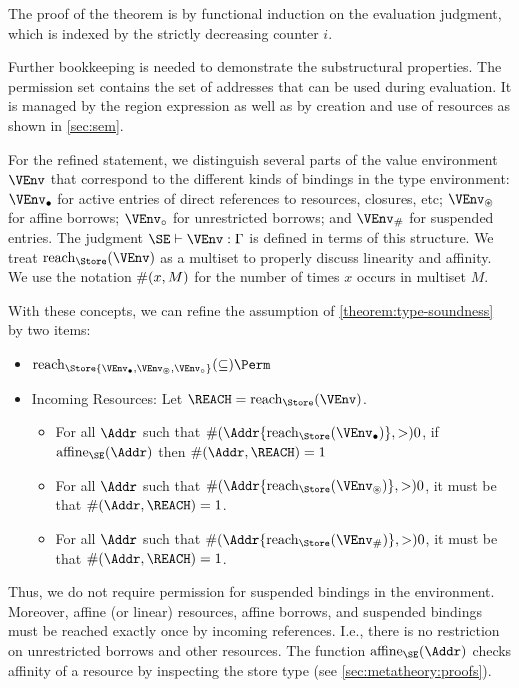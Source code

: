 The proof of the
theorem is by functional induction on the evaluation judgment, which
is indexed by the strictly decreasing counter $i$.

Further bookkeeping is needed to demonstrate the substructural
properties. The permission set contains the set
of addresses that can be used during evaluation. It is managed by the
region expression as well as by creation and use of resources as
shown in \cref{sec:sem}.

For the refined statement, we distinguish several parts of the value
environment $\VEnv$ that correspond to the different kinds of bindings in the
type environment: $\Active\VEnv$ for active entries of direct
references to resources, closures, etc; $\MutableBorrows\VEnv$ for 
affine borrows; $\ImmutableBorrows\VEnv$ for unrestricted borrows;
and $\Suspended\VEnv$ for suspended entries. The judgment
$\SE \vdash \VEnv:\E$ is defined in terms of this structure.
We treat
$\Reach\Store\VEnv$ as a multiset to properly discuss linearity and
affinity. We use the notation $\#(x,M)$ for the number of
times $x$ occurs in multiset $M$.


With these concepts, we can refine the assumption of
\cref{theorem:type-soundness} by two items:
\begin{itemize}
\item $\Reach\Store{\Active\VEnv, \MutableBorrows\VEnv, \ImmutableBorrows\VEnv} \subseteq \Perm$
\item Incoming Resources: Let $\REACH = \Reach\Store\VEnv$.
  \begin{itemize}
  \item 
    For all $\Addr$ such that $\MultiNumber\Addr{\Reach{\Store}{\Active\VEnv}} >0$,
    if $\Affine{\SE}\Addr$ then $\MultiNumber\Addr\REACH= 1$
  \item For all $\Addr$ such that $
    \MultiNumber\Addr{\Reach{\Store}{\MutableBorrows\VEnv}} >0$, it
    must be that $\MultiNumber\Addr\REACH=1$.
  \item For all $\Addr$ such that $
    \MultiNumber\Addr{\Reach{\Store}{\Suspended\VEnv}} >0$, it
    must be that $\MultiNumber\Addr\REACH=1$.
  \end{itemize}
\end{itemize}
Thus, we do not require permission for suspended bindings in the
environment. Moreover, affine (or linear)  resources, affine
borrows, and suspended bindings must be reached exactly once by
incoming references. I.e., there is no restriction on unrestricted
borrows and other resources. The function $\Affine{\SE}\Addr$ checks
affinity of a resource by inspecting the store type (see
\cref{sec:metatheory:proofs}). 

